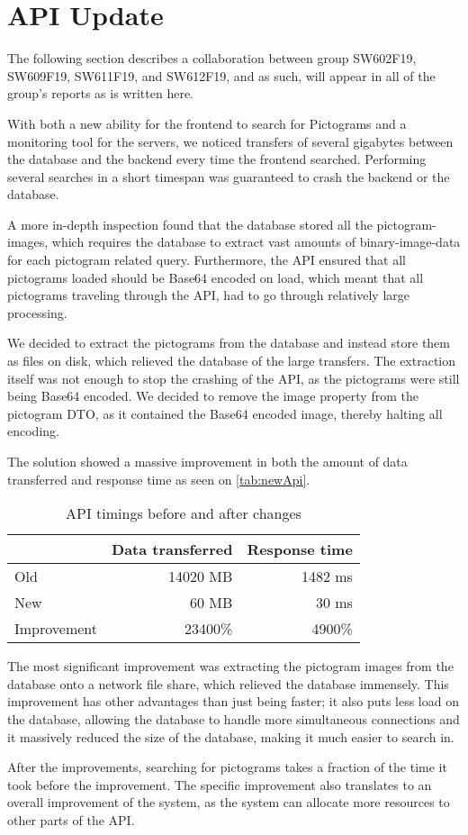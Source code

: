 \section{API Update}\label{CollabAPIUpdate}
The following section describes a collaboration between group SW602F19, SW609F19, SW611F19, and SW612F19, and as such, will appear in all of the group's reports as is written here.

With both a new ability for the frontend to search for Pictograms and a monitoring tool for the servers, we noticed transfers of several gigabytes between the database and the backend every time the frontend searched. 
Performing several searches in a short timespan was guaranteed to crash the backend or the database.

A more in-depth inspection found that the database stored all the pictogram-images, which requires the database to extract vast amounts of binary-image-data for each pictogram related query. 
Furthermore, the API ensured that all pictograms loaded should be Base64 encoded on load, which meant that all pictograms traveling through the API, had to go through relatively large processing.

We decided to extract the pictograms from the database and instead store them as files on disk, which relieved the database of the large transfers. 
The extraction itself was not enough to stop the crashing of the API, as the pictograms were still being Base64 encoded. 
We decided to remove the image property from the pictogram DTO, as it contained the Base64 encoded image, thereby halting all encoding.

The solution showed a massive improvement in both the amount of data transferred and response time as seen on \autoref{tab:newApi}.

\begin{table}[H]
    \centering
    \begin{tabular}{|l|r|r|}
    \hline
                    & Data transferred  & Response time \\ \hline
        Old         & 14020 MB         & 1482 ms      \\ \hline 
        New         & 60 MB             & 30 ms         \\ \hline
        Improvement & 23400\%          & 4900\%       \\ \hline
    \end{tabular}
    \caption{API timings before and after changes}
    \label{tab:newApi}
\end{table}

The most significant improvement was extracting the pictogram images from the database onto a network file share, which relieved the database immensely. 
This improvement has other advantages than just being faster; it also puts less load on the database, allowing the database to handle more simultaneous connections and it massively reduced the size of the database, making it much easier to search in.

After the improvements, searching for pictograms takes a fraction of the time it took before the improvement. 
The specific improvement also translates to an overall improvement of the system, as the system can allocate more resources to other parts of the API.
